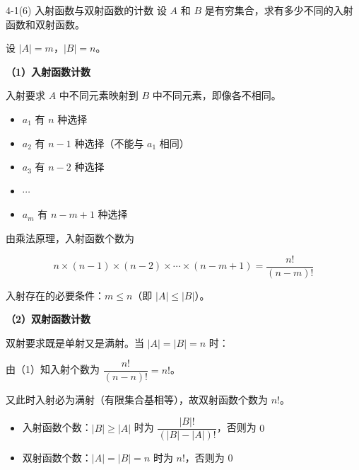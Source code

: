\documentclass[11pt]{article}
\begin{document}
\maketitle
\thispagestyle{empty}
\newpage


\begin{question}{4-1(6) 入射函数与双射函数的计数}
  设 $A$ 和 $B$ 是有穷集合，求有多少不同的入射函数和双射函数。

  \begin{answer}
    设 $|A| = m$，$|B| = n$。

    \vspace{0.5em}
    \textbf{（1）入射函数计数}

    入射要求 $A$ 中不同元素映射到 $B$ 中不同元素，即像各不相同。

    \begin{itemize}
      \item $a_1$ 有 $n$ 种选择
      \item $a_2$ 有 $n-1$ 种选择（不能与 $a_1$ 相同）
      \item $a_3$ 有 $n-2$ 种选择
      \item $\cdots$
      \item $a_m$ 有 $n-m+1$ 种选择
    \end{itemize}

    由乘法原理，入射函数个数为

    $$n \times (n-1) \times (n-2) \times \cdots \times (n-m+1) = \frac{n!}{(n-m)!}$$

    入射存在的必要条件：$m \leq n$（即 $|A| \leq |B|$）。

    \vspace{0.5em}
    \textbf{（2）双射函数计数}

    双射要求既是单射又是满射。当 $|A| = |B| = n$ 时：

    由（1）知入射个数为 $\dfrac{n!}{(n-n)!} = n!$。

    又此时入射必为满射（有限集合基相等），故双射函数个数为 $n!$。

    \begin{info}[结论:]
      \begin{itemize}
        \item 入射函数个数：$|B| \geq |A|$ 时为 $\dfrac{|B|!}{(|B|-|A|)!}$，否则为 $0$
        \item 双射函数个数：$|A| = |B| = n$ 时为 $n!$，否则为 $0$
      \end{itemize}
    \end{info}
  \end{answer}
\end{question}
\end{document}
